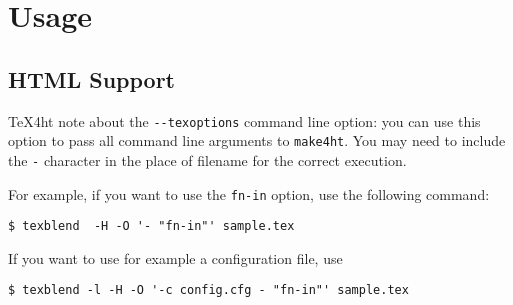 \section{Usage}



\subsection{HTML Support}

\TeX4ht note about the \verb|--texoptions| command line option: you can use
this option to pass all command line arguments to \verb|make4ht|. You may need
to include the \verb|-| character in the place of filename for the correct
execution.

For example, if you want to use the \verb|fn-in| option, use the following command:

\begin{verbatim}
$ texblend  -H -O '- "fn-in"' sample.tex
\end{verbatim}

If you want to use for example a configuration file, use

\begin{verbatim}
$ texblend -l -H -O '-c config.cfg - "fn-in"' sample.tex
\end{verbatim}
